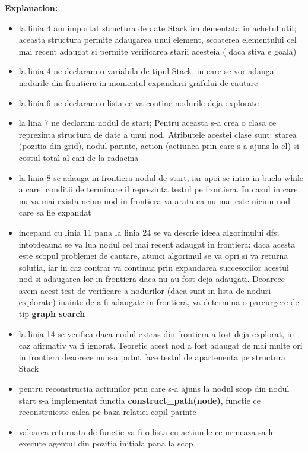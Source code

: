 \textbf{Explanation:}
\begin{itemize}
    \setlength\itemsep{0em}
    \item  la linia 4 am importat structura de date Stack implementata in achetul util; aceasta structura permite adaugarea unui element, scoaterea elementului cel mai recent adaugat si permite verificarea starii acesteia ( daca stiva e goala)
    \item  la linia 4 ne declaram o variabila de tipul Stack, in care se vor adauga nodurile din frontiera in momentul expandarii grafului de cautare
    \item  la linia 6 ne declaram o lista ce va contine nodurile deja explorate
    \item  la lina 7 ne declaram nodul de start; Pentru aceasta s-a crea o clasa ce reprezinta structura de date a unui nod. Atributele acestei clase sunt: starea (pozitia din grid), nodul parinte, action (actiunea prin care s-a ajuns la el) si costul total al caii de la radacina 
    \item la linia 8 se adauga in frontiera nodul de start, iar apoi se intra in bucla while a carei conditii de terminare il reprezinta testul pe frontiera. In cazul in care nu va mai exista nciun nod in frontiera va arata ca nu mai este niciun nod care sa fie expandat
    \item incepand cu linia 11 pana la linia 24 se va descrie ideea algorimului dfs; intotdeauna se va lua nodul cel mai recent adaugat in frontiera: daca acesta este scopul problemei de cautare, atunci algorimul se va opri si va returna solutia, iar in caz contrar va continua prin expandarea succesorilor acestui nod si adaugarea lor in frontiera daca nu au fost deja adaugati. Deoarece avem acest test de verificare a nodurilor (daca sunt in lista de noduri explorate) inainte de a fi adaugate in frontiera, va determina o parcurgere de tip \textbf{graph search}
    \item la linia 14 se verifica daca nodul extras din frontiera a fost deja explorat, in caz afirmativ va fi ignorat. Teoretic acest nod a fost adaugat de mai multe ori in frontiera deaorece nu s-a putut face testul de apartenenta pe structura Stack
    \item pentru reconstructia actiunilor prin care s-a ajuns la nodul scop din nodul start s-a implementat functia \textbf{construct\_path(node)}, functie ce reconstruieste calea pe baza relatiei copil parinte
    \item valoarea returnata de functie va fi o lista cu actiunile ce urmeaza sa le execute agentul din pozitia initiala pana la scop

\end{itemize}



